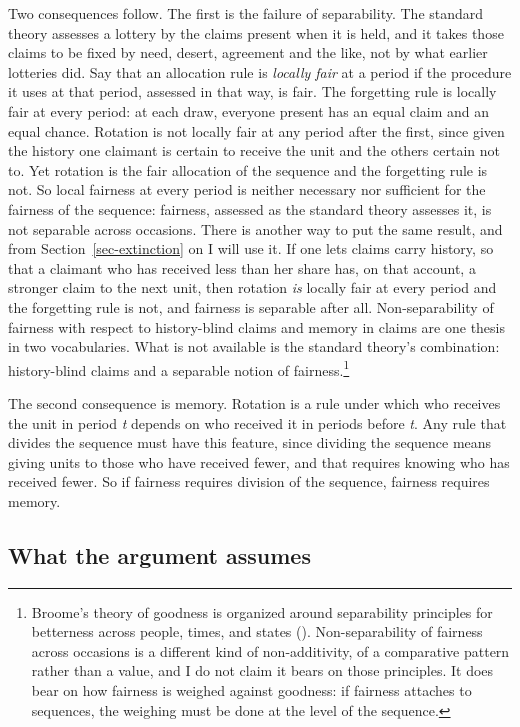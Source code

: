 \documentclass[
  11pt,
  letterpaper,
  DIV=11,
  numbers=noendperiod,
  twoside]{scrartcl}
\begin{document}
Two consequences follow. The first is the failure of separability. The
standard theory assesses a lottery by the claims present when it is
held, and it takes those claims to be fixed by need, desert, agreement
and the like, not by what earlier lotteries did. Say that an allocation
rule is \emph{locally fair} at a period if the procedure it uses at that
period, assessed in that way, is fair. The forgetting rule is locally
fair at every period: at each draw, everyone present has an equal claim
and an equal chance. Rotation is not locally fair at any period after
the first, since given the history one claimant is certain to receive
the unit and the others certain not to. Yet rotation is the fair
allocation of the sequence and the forgetting rule is not. So local
fairness at every period is neither necessary nor sufficient for the
fairness of the sequence: fairness, assessed as the standard theory
assesses it, is not separable across occasions. There is another way to
put the same result, and from Section~\ref{sec-extinction} on I will use
it. If one lets claims carry history, so that a claimant who has
received less than her share has, on that account, a stronger claim to
the next unit, then rotation \emph{is} locally fair at every period and
the forgetting rule is not, and fairness is separable after all.
Non-separability of fairness with respect to history-blind claims and
memory in claims are one thesis in two vocabularies. What is not
available is the standard theory's combination: history-blind claims and
a separable notion of fairness.\footnote{Broome's theory of goodness is
  organized around separability principles for betterness across people,
  times, and states ().
  Non-separability of fairness across occasions is a different kind of
  non-additivity, of a comparative pattern rather than a value, and I do
  not claim it bears on those principles. It does bear on how fairness
  is weighed against goodness: if fairness attaches to sequences, the
  weighing must be done at the level of the sequence.}

The second consequence is memory. Rotation is a rule under which who
receives the unit in period \emph{t} depends on who received it in
periods before \emph{t}. Any rule that divides the sequence must have
this feature, since dividing the sequence means giving units to those
who have received fewer, and that requires knowing who has received
fewer. So if fairness requires division of the sequence, fairness
requires memory.

\subsection{What the argument assumes}\label{sec-assumes}
\end{document}
